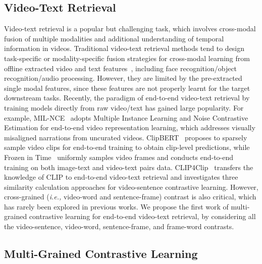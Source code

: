 \documentclass[sigconf]{acmart}
\begin{document}
\subsection{Video-Text Retrieval}
Video-text retrieval is a popular but challenging task, which involves cross-modal fusion of multiple modalities and additional understanding of temporal information in videos. Traditional video-text retrieval methods tend to design task-specific or modality-specific fusion strategies for cross-modal learning from offline extracted video and text features~\citep{yu2017end,gabeur2020multi,he2021improving,liu2021hit,patrick2020support,jang2017tgif,le2020hierarchical}, including face recognition/object recognition/audio processing. However, they are limited by the pre-extracted single modal features, since these features are not properly learnt for the target downstream tasks. Recently, the paradigm of end-to-end video-text retrieval by training models directly from raw video/text has gained large popularity. For example, MIL-NCE~\citep{miech2020end} adopts Multiple Instance Learning and Noise Contrastive Estimation for end-to-end video representation learning, which addresses visually misaligned narrations from uncurated videos. ClipBERT~\citep{lei2021less} proposes to sparsely sample video clips for end-to-end training to obtain clip-level predictions, while Frozen in Time~\citep{bain2021frozen} uniformly samples video frames and conducts end-to-end training on both image-text and video-text pairs data. CLIP4Clip~\citep{luo2021clip4clip} transfers the knowledge of CLIP to end-to-end video-text retrieval and investigates three similarity calculation approaches for video-sentence contrastive learning. However, cross-grained (\emph{i.e.,} video-word and sentence-frame) contrast is also critical, which has rarely been explored in previous works. We propose the first work of multi-grained contrastive learning for end-to-end video-text retrieval, by considering all the video-sentence, video-word, sentence-frame, and frame-word contrasts. 


\subsection{Multi-Grained Contrastive Learning}
\end{document}

